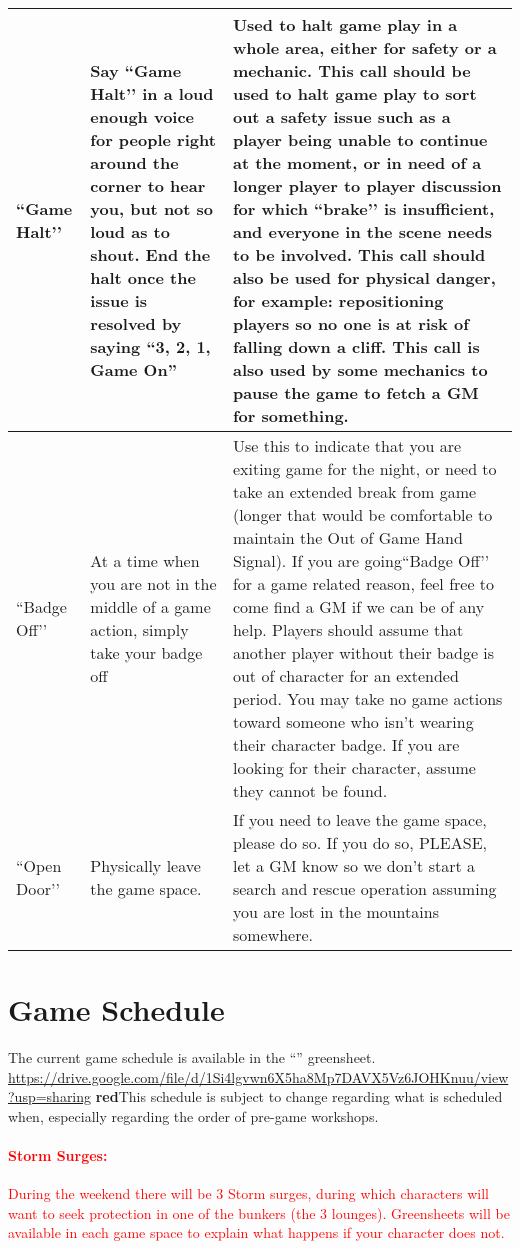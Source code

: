 \documentclass[sheet]{GL2020}
\begin{document}
\begin{tabularx}{\textwidth}{|>{\centering\arraybackslash} m{1.5cm} | >{\centering\arraybackslash} m{2.5cm} | >{\centering\arraybackslash}X |}
    \hline
``Game Halt'’ & Say ``Game Halt'’ in a loud enough voice for people right around the corner to hear you, but not so loud as to shout. End the halt once the issue is resolved by saying “3, 2, 1, Game On” &  Used to halt game play in a whole area, either for safety or a mechanic. This call should be used to halt game play to sort out a safety issue such as a player being unable to continue at the moment, or in need of a longer player to player discussion for which ``brake'’ is insufficient, and everyone in the scene needs to be involved. This call should also be used for physical danger, for example: repositioning players so no one is at risk of falling down a cliff. This call is also used by some mechanics to pause the game to fetch a GM for something. \\
    \hline
``Badge Off'’ & At a time when you are not in the middle of a game action, simply take your badge off & Use this to indicate that you are exiting game for the night, or need to take an extended break from game (longer that would be comfortable to maintain the Out of Game Hand Signal). If you are going``Badge Off'’ for a game related reason, feel free to come find a GM if we can be of any help. Players should assume that another player without their badge is out of character for an extended period. You may take no game actions toward someone who isn't wearing their character badge. If you are looking for their character, assume they cannot be found. \\
    \hline
``Open Door'’ & Physically leave the game space. & If you need to leave the game space, please do so. If you do so, PLEASE, let a GM know so we don't start a search and rescue operation assuming you are lost in the mountains somewhere. \\
    \hline
\end{tabularx}

\section{Game Schedule}
The current game	schedule is available in the ``\gWeekendSchedule{\MYname}'' greensheet. \url{https://drive.google.com/file/d/1Si4lgvwn6X5ha8Mp7DAVX5Vz6JOHKnuu/view?usp=sharing} \textbf{red}{This schedule is subject to change regarding what is scheduled when, especially regarding the order of pre-game workshops.}

\textcolor{red}{\paragraph{Storm Surges:} During the weekend there will be 3 Storm surges, during which characters will want to seek protection in one of the bunkers (the 3 lounges). Greensheets will be available in each game space to explain what happens if your character does not.}
\end{document}
